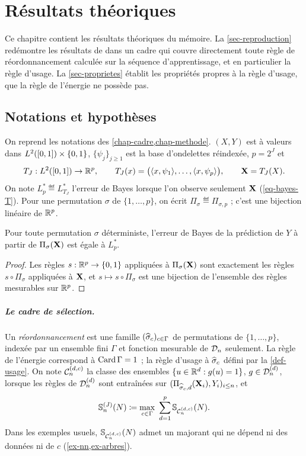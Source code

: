 \chapter{Résultats théoriques}\label{chap-theorie}

Ce chapitre contient les résultats théoriques du mémoire. La \cref{sec-reproduction} redémontre les résultats de \citet{berlinet2008functional} dans un cadre qui couvre directement toute règle de réordonnancement calculée sur la séquence d'apprentissage, et en particulier la règle d'usage. La \cref{sec-proprietes} établit les propriétés propres à la règle d'usage, que la règle de l'énergie ne possède pas.

\section{Notations et hypothèses}\label{sec-notations}

On reprend les notations des \cref{chap-cadre,chap-methode}. $(X,Y)$ est à valeurs dans $L^2([0,1])\times\{0,1\}$, $\{\psi_j\}_{j\ge1}$ est la base d'ondelettes réindexée, $p=2^J$ et
\[
  T_J:L^2([0,1])\to\mathbb{R}^p,\qquad T_J(x)=\bigl(\langle x,\psi_1\rangle,\dots,\langle x,\psi_p\rangle\bigr),\qquad \mathbf{X}=T_J(X).
\]
On note $L^*_p\eqdef L^*_{T_J}$ l'erreur de Bayes lorsque l'on observe seulement $\mathbf{X}$ (\cref{eq-bayes-T}). Pour une permutation $\sigma$ de $\{1,\dots,p\}$, on écrit $\Pi_\sigma\eqdef\Pi_{\sigma,p}$ ; c'est une bijection linéaire de $\mathbb{R}^p$.

\begin{lemme}\label{lem-bayes-permutation}
Pour toute permutation $\sigma$ déterministe, l'erreur de Bayes de la prédiction de $Y$ à partir de $\Pi_\sigma(\mathbf{X})$ est égale à $L^*_p$.
\end{lemme}

\begin{proof}
Les règles $s:\mathbb{R}^p\to\{0,1\}$ appliquées à $\Pi_\sigma(\mathbf{X})$ sont exactement les règles $s\circ\Pi_\sigma$ appliquées à $\mathbf{X}$, et $s\mapsto s\circ\Pi_\sigma$ est une bijection de l'ensemble des règles mesurables sur $\mathbb{R}^p$.
\end{proof}

\paragraph{Le cadre de sélection.} Un \emph{réordonnancement} est une famille $(\widehat{\sigma}_c)_{c\in\Gamma}$ de permutations de $\{1,\dots,p\}$, indexée par un ensemble fini $\Gamma$ et fonction mesurable de $\mathcal{D}_n$ seulement. La règle de l'énergie correspond à $\operatorname{Card}\Gamma=1$ ; la règle d'usage à $\widehat{\sigma}_c$ défini par la \cref{def-usage}. On note $\mathcal{C}_n^{(d,c)}$ la classe des ensembles $\{u\in\mathbb{R}^d:g(u)=1\}$, $g\in\mathcal{D}_n^{(d)}$, lorsque les règles de $\mathcal{D}_n^{(d)}$ sont entraînées sur $(\Pi_{\widehat{\sigma}_c,d}(\mathbf{X}_i),Y_i)_{i\le n}$, et
\[
  \Sh^{(J)}_n(N)\eqdef\max_{c\in\Gamma}\ \sum_{d=1}^p\Sh_{\cC_n^{(d,c)}}(N).
\]
Dans les exemples usuels, $\mathbb{S}_{\mathcal{C}_n^{(d,c)}}(N)$ admet un majorant qui ne dépend ni des données ni de $c$ (\cref{ex-nn,ex-arbres}).

